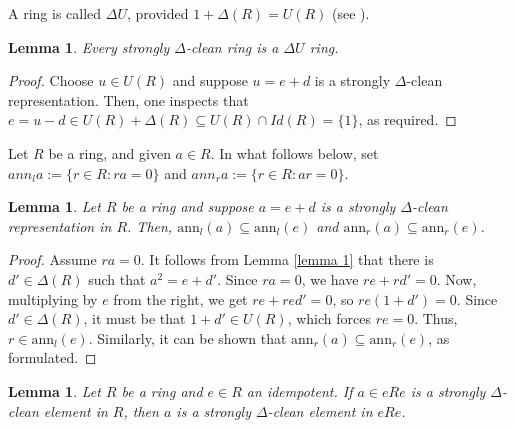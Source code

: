 \documentclass[12pt]{amsart}
\newtheorem{lemma}[theorem]{Lemma}
\theoremstyle{definition}
\begin{document}
A ring is called \(\Delta U\), provided \(1 + \Delta(R) = U(R)\) (see \cite{kkqt}).

\begin{lemma}\label{du ring}
Every strongly $\Delta$-clean ring is a \(\Delta U\) ring.
\end{lemma}

\begin{proof}
Choose \(u \in U(R)\) and suppose \(u = e + d\) is a strongly $\Delta$-clean representation. Then, one inspects that \(e = u - d \in U(R) + \Delta(R) \subseteq U(R) \cap Id(R) = \{1\}\), as required.
\end{proof}

Let $R$ be a ring, and given $a \in R$. In what follows below, set $ann_{l}a := \{ r \in R : ra = 0\}$ and $ann_{r}a := \{r \in  R: ar = 0\}$.

\begin{lemma}\label{ann}
Let $R$ be a ring and suppose $a = e + d$ is a strongly $\Delta$-clean representation in $R$. Then, $\text{ann}_l(a) \subseteq \text{ann}_l(e)$ and $\text{ann}_r(a) \subseteq \text{ann}_r(e)$.
\end{lemma}

\begin{proof}
Assume $ra = 0$. It follows from Lemma \ref{lemma 1} that there is $d' \in \Delta(R)$ such that $a^2 = e + d'$. Since $ra = 0$, we have $re + rd' = 0$. Now, multiplying by $e$ from the right, we get $re + red' = 0$, so $re(1 + d') = 0$. Since $d' \in \Delta(R)$, it must be that $1 + d' \in U(R)$, which forces $re = 0$. Thus, $r \in \text{ann}_l(e)$. Similarly, it can be shown that $\text{ann}_r(a) \subseteq \text{ann}_r(e)$, as formulated.
\end{proof}

\begin{lemma}
Let $R$ be a ring and $e \in R$ an idempotent. If $a \in eRe$ is a strongly $\Delta$-clean element in $R$, then $a$ is a strongly $\Delta$-clean element in $eRe$.
\end{lemma}
\end{document}
